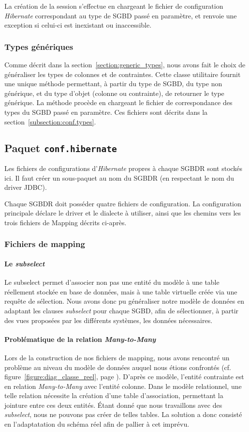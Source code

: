 La création de la session s'effectue en chargeant le fichier de configuration \emph{Hibernate} correspondant au type de SGBD passé en paramètre, et renvoie une exception si celui-ci est inexistant ou inaccessible.

\subsubsection{Types génériques}
Comme décrit dans la section~\ref{section:generic_types}, nous avons fait le choix de généraliser les types de colonnes et de contraintes. Cette classe utilitaire fournit une unique méthode permettant, à partir du type de SGBD, du type non générique, et du type d'objet (colonne ou contrainte), de retourner le type générique. La méthode procède en chargeant le fichier de correspondance des types du SGBD passé en paramètre. Ces fichiers sont décrits dans la section~\ref{subsection:conf.types}.

\subsection{Paquet \texttt{conf.hibernate}}
Les fichiers de configurations d'\emph{Hibernate} propres à chaque SGBDR sont stockés ici. Il faut créer un sous-paquet au nom du SGBDR (en respectant le nom du driver JDBC).

Chaque SGBDR doit posséder quatre fichiers de configuration. La configuration principale déclare le driver et le dialecte à utiliser, ainsi que les chemins vers les trois fichiers de Mapping décrits ci-après.
\subsubsection{Fichiers de mapping}
\paragraph{Le \emph{subselect}} Le subselect permet d'associer non pas une entité du modèle à une table réellement stockée en  base de données, mais à une table virtuelle créée via une requête de sélection. Nous avons donc pu généraliser notre modèle de données en adaptant les clauses \emph{subselect} pour chaque SGBD, afin de sélectionner, à partir des vues proposées par les différents systèmes, les données nécessaires.

\paragraph{Problématique de la relation \emph{Many-to-Many}}
Lors de la construction de nos fichiers de mapping, nous avons rencontré un problème au niveau du modèle de données auquel nous étions confrontés (cf. figure~\ref{figure:diag_classe_reel}, page \pageref{figure:diag_classe_reel}). D'après ce modèle, l'entité contrainte est en relation \emph{Many-to-Many} avec l'entité colonne. Dans le modèle relationnel, une telle relation nécessite la création d'une table d'association, permettant la jointure entre ces deux entités. Étant donné que nous travaillons avec des \emph{subselect}, nous ne pouvons pas créer de telles tables. La solution a donc consisté en l'adaptatation du schéma réel afin de pallier à cet imprévu.

